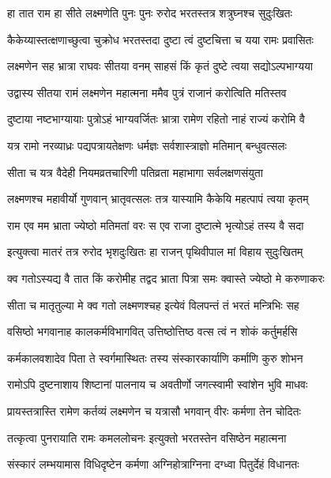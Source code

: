 \twolineshloka
{हा तात राम हा सीते लक्ष्मणेति पुनः पुनः}
{रुरोद भरतस्तत्र शत्रुघ्नश्च सुदुःखितः} %

\twolineshloka
{कैकेय्यास्तत्क्षणाच्छुत्वा चुक्रोध भरतस्तदा}
{दुष्टा त्वं दुष्टचित्ता च यया रामः प्रवासितः} %

\twolineshloka
{लक्ष्मणेन सह भ्रात्रा राघवः सीतया वनम्}
{साहसं किं कृतं दुष्टे त्वया सद्यो‍ऽल्पभाग्यया} %

\twolineshloka
{उद्वास्य सीतया रामं लक्ष्मणेन महात्मना}
{ममैव पुत्रं राजानं करोत्विति मतिस्तव} %

\twolineshloka
{दुष्टाया नष्टभाग्यायाः पुत्रोऽहं भाग्यवर्जितः}
{भ्रात्रा रामेण रहितो नाहं राज्यं करोमि वै} %

\twolineshloka
{यत्र रामो नरव्याध्रः पद्यपत्रायतेक्षणः}
{धर्मज्ञः सर्वशास्त्राज्ञो मतिमान् बन्धुवत्सलः} %

\twolineshloka
{सीता च यत्र वैदेही नियमव्रतचारिणी}
{पतिव्रता महाभागा सर्वलक्षणसंयुता} %

\twolineshloka
{लक्ष्मणश्च महावीर्यो गुणवान् भ्रातृवत्सलः}
{तत्र यास्यामि कैकेयि महत्पापं त्वया कृतम्} %

\twolineshloka
{राम एव मम भ्राता ज्येष्ठो मतिमतां वरः}
{स एव राजा दुष्टात्मे भृत्यो‍ऽहं तस्य वै सदा} %

\twolineshloka
{इत्युक्त्वा मातरं तत्र रुरोद भृशदुःखितः}
{हा राजन् पृथिवीपाल मां विहाय सुदुःखितम्} %

\twolineshloka
{क्व गतोऽस्यद्य वै तात किं करोमीह तद्वद}
{भ्राता पित्रा समः क्वास्ते ज्येष्ठो मे करुणाकरः} %

\twolineshloka
{सीता च मातृतुल्या मे क्व गतो लक्ष्मणश्चह}
{इत्येवं विलपन्तं तं भरतं मन्त्रिभिः सह} %

\twolineshloka
{वसिष्ठो भगवानाह कालकर्मविभागवित्}
{उत्तिष्ठोत्तिष्ठ वत्स त्वं न शोकं कर्तुमर्हसि} %

\twolineshloka
{कर्मकालवशादेव पिता ते स्वर्गमास्थितः}
{तस्य संस्कारकार्याणि कर्माणि कुरु शोभन} %

\twolineshloka
{रामोऽपि दुष्टनाशाय शिष्टानां पालनाय च}
{अवतीर्णो जगत्स्वामी स्वांशेन भुवि माधवः} %

\twolineshloka
{प्रायस्तत्रास्ति रामेण कर्तव्यं लक्ष्मणेन च}
{यत्रासौ भगवान् वीरः कर्मणा तेन चोदितः} %

\twolineshloka
{तत्कृत्वा पुनरायाति रामः कमललोचनः}
{इत्युक्तो भरतस्तेन वसिष्ठेन महात्मना} %

\twolineshloka
{संस्कारं लम्भयामास विधिदृष्टेन कर्मणा}
{अग्निहोत्राग्निना दग्ध्वा पितुर्देहं विधानतः} %

